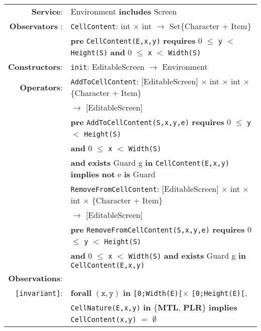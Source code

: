 \documentclass[7pt]{article}
\begin{document}
\begin{tabular}{rl}
\textbf{Service}: & Environment \textbf{includes} Screen
\\ \textbf{Observators} : & \texttt{CellContent}:
\textrm{int} $\times$ \textrm{int} $\rightarrow$
\textrm{Set\{Character + Item\}} \\
& \quad \textbf{pre } \texttt{CellContent(E,x,y)} \textbf{ requires } 0 $\leq$ \texttt{y} $<$ \texttt{Height(S)} \textbf{ and } 0 $\leq$ \texttt{x} $<$ \texttt{Width(S)}\\
\textbf{Constructors}: & \texttt{init}: \textrm{EditableScreen} $\rightarrow$ \textrm{Environment} \\
\textbf{Operators}: & \texttt{AddToCellContent}: \textrm{[EditableScreen]} $\times$ \textrm{int} $\times$ \textrm{int} $\times$ \textrm{\{Character + Item\}} \\ & \quad\quad\quad\quad\quad\quad\quad\quad\quad\quad  $\rightarrow$ \textrm{[EditableScreen]} \\
& \quad \textbf{pre } \texttt{AddToCellContent(S,x,y,e)} \textbf{ requires } 0 $\leq$ \texttt{y} $<$ \texttt{Height(S)} \\ & \quad\quad\quad\quad \textbf{and} 0 $\leq$ \texttt{x} $<$ \texttt{Width(S)} \\
& \quad\quad\quad\quad  \textbf{and} \textbf{exists} \textrm{Guard g} \textbf{in} \texttt{CellContent(E,x,y)} \textbf{implies} \textbf{not} e \textbf{is}  \textrm{Guard} \\
& \texttt{RemoveFromCellContent}: \textrm{[EditableScreen]} $\times$ \textrm{int} $\times$ \textrm{int} $\times$ \textrm{\{Character + Item\}} \\ & \quad\quad\quad\quad\quad\quad\quad\quad\quad\quad  $\rightarrow$ \textrm{[EditableScreen]} \\
& \quad \textbf{pre } \texttt{RemoveFromCellContent(S,x,y,e)} \textbf{ requires } 0 $\leq$ \texttt{y} $<$ \texttt{Height(S)} \\
& \quad\quad\quad\quad\textbf{and} 0 $\leq$ \texttt{x} $<$ \texttt{Width(S)}  \textbf{ and } \textbf{exists} \textrm{Guard g} \textbf{in} \texttt{CellContent(E,x,y)} \\
\textbf{Observations}: \\
\texttt{[invariant]}: & \textbf{forall} $(\mathtt{x},\mathtt{y})$ \textbf{in} \texttt{[0;Width(E)[}$\times$ \texttt{[0;Height(E)[},~\\ & \quad\quad \texttt{CellNature(E,x,y)} \textbf{in} \{\textbf{MTL}, \textbf{PLR}\} \textbf{implies} \texttt{CellContent(x,y)} $=$ $\emptyset$  \\

\end{tabular}
\end{document}

